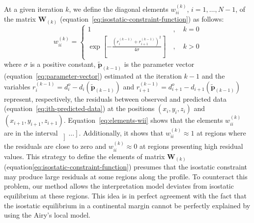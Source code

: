 \documentclass[manuscript]{geophysics}
\begin{document}
At a given iteration $k$, we define the diagonal elements $w_{ii}^{(k)}$, $i = 1, \dots, N - 1$,
of the matrix $\mathbf{W}_{(k)}$ (equation~\ref{eq:isostatic-constraint-function}) as follows:
\begin{equation} \label{eq:elements-wii}
w_{ii}^{(k)} = \begin{cases}
1 \: &, \quad k = 0 \\
\exp \left[ - \frac{ \left( r_{i}^{(k-1)} + r_{i+1}^{(k-1)} \right)^{2}}{4 \sigma} \right]
\: &, \quad k > 0
\end{cases}
\end{equation}
where $\sigma$ is a positive constant, $\tilde{\mathbf{p}}_{(k-1)}$ is the
parameter vector (equation~\ref{eq:parameter-vector}) estimated at the iteration $k-1$
and the variables
$r_{i}^{(k-1)} = d^{o}_{i} - d_{i} \left( \tilde{\mathbf{p}}_{(k-1)} \right)$ and 
$r_{i+1}^{(k-1)} = d^{o}_{i+1} - d_{i+1} \left(\tilde{\mathbf{p}}_{(k-1)} \right)$ represent,
respectively, the residuals between observed and predicted data
(equation~\ref{eq:ith-predicted-data}) at the positions $(x_{i}, y_{i}, z_{i})$ and 
$(x_{i+1}, y_{i+1}, z_{i+1})$. Equation~\ref{eq:elements-wii} shows that the elements 
$w_{ii}^{(k)}$ are in the interval $\left] \dots \right]$. Additionally, it shows that
$w_{ii}^{(k)} \approx 1$ at regions where the residuals are close to zero and 
$w_{ii}^{(k)} \approx 0$ at regions presenting high residual values. 
This strategy to define the elements of matrix $\mathbf{W}_{(k)}$ 
(equation\ref{eq:isostatic-constraint-function}) presumes that the isostatic constraint may
produce large residuals at some regions along the profile. To counteract this problem,
our method allows the interpretation model deviates from isostatic equilibrium at these 
regions. This idea is in perfect agreement with the fact that the isostatic equilibrium
in a continental margin cannot be perfectly explained by using the Airy's local model.
\end{document}
